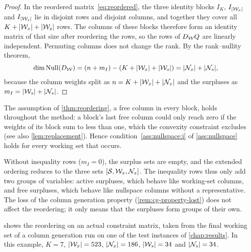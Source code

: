 \begin{proof}
In the reordered matrix~\eqref{eq:reordered}, the three identity blocks $I_K$, $I_{|\mathcal{W}_x|}$ and
$I_{|\mathcal{W}_s|}$ lie in disjoint rows and disjoint columns, and together they cover all
$K + |\mathcal{W}_x| + |\mathcal{W}_s|$ rows. The columns of these blocks therefore form an identity matrix of
that size after reordering the rows, so the rows of $D_{\mathcal{W}} Q$ are linearly independent.
Permuting columns does not change the rank. By the rank--nullity theorem,
\[
\dim\operatorname{Null}(D_{\mathcal{W}}) = (n+m_I) - (K+|\mathcal{W}_x|+|\mathcal{W}_s|) = |\mathcal{N}_x| + |\mathcal{N}_s|,
\]
because the column weights split as $n = K + |\mathcal{W}_x| + |\mathcal{N}_x|$ and the surpluses as
$m_I = |\mathcal{W}_s| + |\mathcal{N}_s|$.
\end{proof}

The assumption of \cref{thm:reordering}, a free column in every block, holds throughout the
method: a block's last free column could only reach zero if the weights of its block sum to
less than one, which the convexity constraint excludes (see also \cref{lem:replacement}).
Hence condition~\ref{ass:nullspace:i} of \cref{ass:nullspace} holds for every working set that occurs.

\begin{remark} \label{rem:three-sets}
Without inequality rows ($m_I = 0$), the surplus sets are empty, and the extended ordering
reduces to the three sets $[\mathcal{S},\mathcal{W}_x,\mathcal{N}_x]$. The inequality rows thus only add two groups of
variables: active surpluses, which behave like working-set columns, and free surpluses, which
behave like nullspace columns without a representative. The loss of the column generation
property (\cref{rem:cg-property-lost}) does not affect the reordering; it only means that the
surpluses form groups of their own.
\end{remark}

 shows the reordering on an actual constraint matrix, taken from the final
working set of a column generation run on one of the test instances of \cref{chap:results}.
In this example, $K = 7$, $|\mathcal{W}_x| = 523$, $|\mathcal{N}_x| = 186$, $|\mathcal{W}_s| = 34$ and $|\mathcal{N}_s| = 34$.

